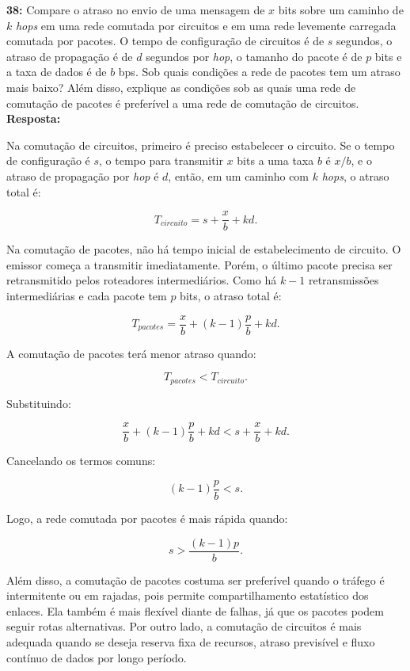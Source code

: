 \documentclass[12pt,a4paper]{report}
\begin{document}
\vspace{0.6cm}

\noindent \textbf{38:} Compare o atraso no envio de uma mensagem de $x$ bits sobre um caminho de $k$ \textit{hops} em uma rede comutada por circuitos e em uma rede levemente carregada comutada por pacotes. O tempo de configuração de circuitos é de $s$ segundos, o atraso de propagação é de $d$ segundos por \textit{hop}, o tamanho do pacote é de $p$ bits e a taxa de dados é de $b$ bps. Sob quais condições a rede de pacotes tem um atraso mais baixo? Além disso, explique as condições sob as quais uma rede de comutação de pacotes é preferível a uma rede de comutação de circuitos.\\
\textbf{Resposta:}

Na comutação de circuitos, primeiro é preciso estabelecer o circuito. Se o tempo de configuração é $s$, o tempo para transmitir $x$ bits a uma taxa $b$ é $x/b$, e o atraso de propagação por \textit{hop} é $d$, então, em um caminho com $k$ \textit{hops}, o atraso total é:

\[
T_{circuito} = s + \frac{x}{b} + kd.
\]

Na comutação de pacotes, não há tempo inicial de estabelecimento de circuito. O emissor começa a transmitir imediatamente. Porém, o último pacote precisa ser retransmitido pelos roteadores intermediários. Como há $k-1$ retransmissões intermediárias e cada pacote tem $p$ bits, o atraso total é:

\[
T_{pacotes} = \frac{x}{b} + (k-1)\frac{p}{b} + kd.
\]

A comutação de pacotes terá menor atraso quando:

\[
T_{pacotes} < T_{circuito}.
\]

Substituindo:

\[
\frac{x}{b} + (k-1)\frac{p}{b} + kd < s + \frac{x}{b} + kd.
\]

Cancelando os termos comuns:

\[
(k-1)\frac{p}{b} < s.
\]

Logo, a rede comutada por pacotes é mais rápida quando:

\[
\boxed{s > \frac{(k-1)p}{b}}.
\]

Além disso, a comutação de pacotes costuma ser preferível quando o tráfego é intermitente ou em rajadas, pois permite compartilhamento estatístico dos enlaces. Ela também é mais flexível diante de falhas, já que os pacotes podem seguir rotas alternativas. Por outro lado, a comutação de circuitos é mais adequada quando se deseja reserva fixa de recursos, atraso previsível e fluxo contínuo de dados por longo período.
\end{document}
